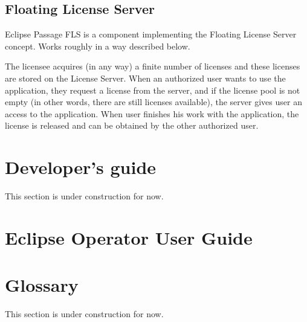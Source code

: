 \documentclass[12pt]{report}
\begin{document}
\section*{Floating License Server}

Eclipse Passage FLS is a component implementing the Floating License Server concept. Works roughly in a way described below.

The licensee acquires (in any way) a finite number of licenses and these licenses are stored on the License Server. When an authorized user wants to use the application,
they request a license from the server, and if the license pool is not empty (in other words, there are still licenses available), the server gives user an access to the
application. When user finishes his work with the application, the license is released and can be obtained by the other authorized user.

\chapter*{Developer's guide}

This section is under construction for now.

\chapter*{Eclipse Operator User Guide}

\chapter*{Glossary}

This section is under construction for now.
\end{document}
